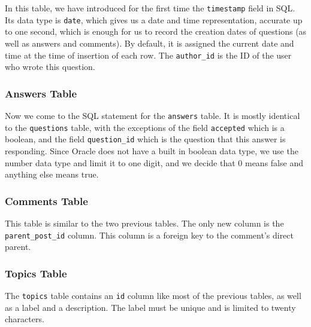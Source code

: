 In this table, we have introduced for the first time the \verb`timestamp` field in SQL. Its data type is \verb`date`, which gives us a date and time representation, accurate up to one second, which is enough for us to record the creation dates of questions (as well as answers and comments). By default, it is assigned the current date and time at the time of insertion of each row. The \verb`author_id` is the ID of the user who wrote this question.


\subsubsection{Answers Table}

Now we come to the SQL statement for the \verb`answers` table. It is mostly identical to the \verb`questions` table, with the exceptions of the field \verb`accepted` which is a boolean, and the field \verb`question_id` which is the question that this answer is responding. Since Oracle does not have a built in boolean data type, we use the number data type and limit it to one digit, and we decide that 0 means false and anything else means true.


\subsubsection{Comments Table}

This table is similar to the two previous tables. The only new column is the \verb`parent_post_id` column. This column is a foreign key to the comment's direct parent.


\subsubsection{Topics Table}

The \verb`topics` table contains an \verb`id` column like most of the previous tables, as well as a label and a description. The label must be unique and is limited to twenty characters.


